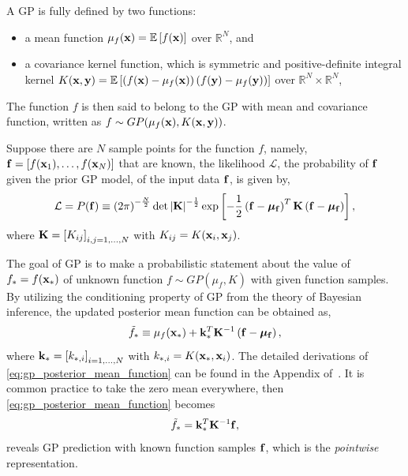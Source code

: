 A GP is fully defined by two functions:
\begin{itemize}
    \item a mean function \( \mu_{f} (\mathbf{x}) = \mathbb{E} \left[ f(\mathbf{x}) \right] \) over \( \mathbb{R}^{N} \), and
    \item a covariance kernel function, which is symmetric and positive-definite integral kernel
        \( K(\mathbf{x}, \mathbf{y}) = \mathbb{E}\left[ \left( f(\mathbf{x}) - \mu_{f} (\mathbf{x}) \right) \left( f(\mathbf{y}) - \mu_{f} (\mathbf{y}) \right) \right] \)
        over \( \mathbb{R}^{N} \times \mathbb{R}^{N} \),
\end{itemize}
The function \( f \) is then said to belong to the GP with mean and covariance function,
written as \( f \sim GP(\mu_{f} (\mathbf{x}), K(\mathbf{x}, \mathbf{y})) \).

Suppose there are \( N \) sample points for the function \( f \), namely, \( \mathbf{f} = \left[ f(\mathbf{x}_{1}), \dots, f(\mathbf{x}_{N}) \right] \)
that are known, the likelihood \( \mathcal{L} \), the probability of \( \mathbf{f} \) given the prior GP model,
of the input data \( \mathbf{f} \), is given by,
\begin{equation}\label{eq:gp_likelihood}
    \mathcal{L} = P(\mathbf{f}) \equiv \left( 2 \pi \right)^{- \frac{N}{2}} \det \left| \mathbf{K} \right|^{-\frac{1}{2}}
    \exp \left[ -\frac{1}{2} \left( \mathbf{f} - \bm{\mu}_{\mathbf{f}} \right)^{T} \mathbf{K} \left( \mathbf{f} - \bm{\mu}_{\mathbf{f}} \right) \right],
\end{equation}
where \( \mathbf{K} = \left[ K_{ij} \right]_{i, j = 1, \dots, N} \) with \( K_{ij} = K(\mathbf{x}_{i}, \mathbf{x}_{j}) \).

The goal of GP is to make a probabilistic statement about the value of \( f_{*} = f (\mathbf{x}_{*}) \)
of unknown function \( f \sim GP(\mu_{f}, K) \) with given function samples.
By utilizing the conditioning property of GP from the theory of Bayesian inference,
the updated posterior mean function can be obtained as,
\begin{equation}\label{eq:gp_posterior_mean_function}
    \tilde{f}_{*} \equiv \mu_{f}(\mathbf{x}_{*}) + \mathbf{k}_{*}^{T} \mathbf{K}^{-1} \left( \mathbf{f} - \bm{\mu}_{\mathbf{f}} \right),
\end{equation}
where \( \mathbf{k}_{*} = \left[ k_{*,i} \right]_{i = 1, \dots, N} \) with \( k_{*,i} = K(\mathbf{x}_{*}, \mathbf{x}_{i}) \).
The detailed derivations of \cref{eq:gp_posterior_mean_function} can be found
in the Appendix of~\cite{reyes2018new}.
It is common practice to take the zero mean everywhere, then \cref{eq:gp_posterior_mean_function} becomes
\begin{equation}\label{eq:gp_intp}
    \tilde{f}_{*} = \mathbf{k}_{*}^{T} \mathbf{K}^{-1} \mathbf{f},
\end{equation}
reveals GP prediction with known function samples \( \mathbf{f} \), which is the \textit{pointwise} representation.

